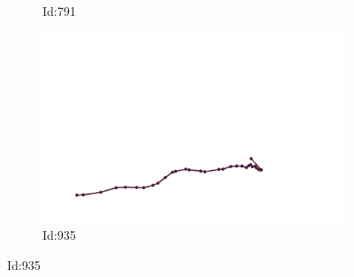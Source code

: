 \documentclass[12pt,twoside]{report}
\begin{document}
\begin{figure}
\begin{subfigure}[b]{0.20\textwidth}
\caption{Id:791}
\end{subfigure}
\begin{subfigure}[b]{0.20\textwidth}
\centering
\includegraphics[width=\textwidth]{../../trajectories/935.png}
\caption{Id:935}
\end{subfigure}
\end{figure}
\end{document}
